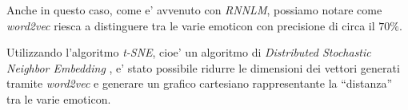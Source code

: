 \documentclass[a4paper,12pt,openright,twoside]{report}
\theoremstyle{definition}
\begin{document}
Anche in questo caso, come e' avvenuto con \emph{RNNLM}, possiamo notare come \emph{word2vec} riesca a distinguere tra le varie emoticon con precisione di circa il $70\%$.

%

Utilizzando l'algoritmo \emph{t-SNE}, cioe' un algoritmo di \emph{Distributed Stochastic Neighbor Embedding }, e' stato possibile
ridurre le dimensioni dei vettori generati tramite \emph{word2vec} e generare un grafico cartesiano rappresentante la ``distanza''
tra le varie emoticon.
\end{document}
